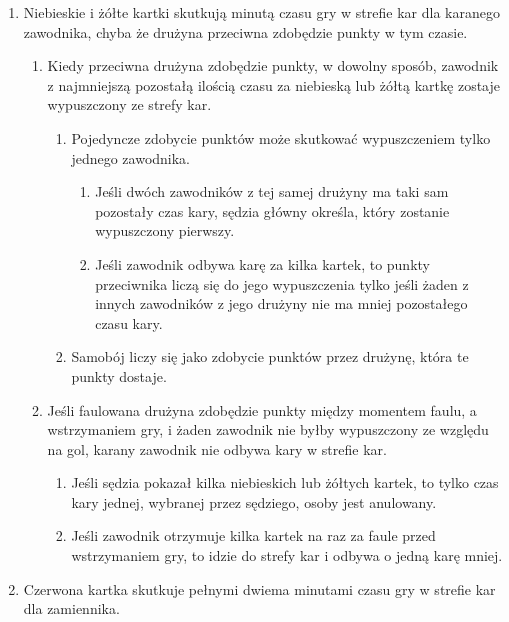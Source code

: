 \documentclass[11pt,a4paper]{article}
\renewcommand{\subsubsection}[1]{
  \oldsubsubsection{#1}%
  \label{\thesubsubsection}
}
\begin{document}
\subsubsection{Czas kary}
\begin{enumerate}
  \item Niebieskie i żółte kartki skutkują minutą czasu gry w strefie kar dla karanego zawodnika, chyba że drużyna przeciwna zdobędzie punkty w tym czasie.
  \begin{enumerate}
    \item Kiedy przeciwna drużyna zdobędzie punkty, w dowolny sposób, zawodnik z najmniejszą pozostałą ilością czasu za niebieską lub żółtą kartkę zostaje wypuszczony ze strefy kar.
    \begin{enumerate}
      \item Pojedyncze zdobycie punktów może skutkować wypuszczeniem tylko jednego zawodnika.
      \begin{enumerate}
        \item Jeśli dwóch zawodników z tej samej drużyny ma taki sam pozostały czas kary, sędzia główny określa, który zostanie wypuszczony pierwszy.
        \item Jeśli zawodnik odbywa karę za kilka kartek, to punkty przeciwnika liczą się do jego wypuszczenia tylko jeśli żaden z innych zawodników z jego drużyny nie ma mniej pozostałego czasu kary.
      \end{enumerate}
      \item Samobój liczy się jako zdobycie punktów przez drużynę, która te punkty dostaje.
    \end{enumerate}
    \item Jeśli faulowana drużyna zdobędzie punkty między momentem faulu, a wstrzymaniem gry, i żaden zawodnik nie byłby wypuszczony ze względu na gol, karany zawodnik nie odbywa kary w strefie kar.
    \begin{enumerate}
      \item Jeśli sędzia pokazał kilka niebieskich lub żółtych kartek, to tylko czas kary jednej, wybranej przez sędziego, osoby jest anulowany.
      \item Jeśli zawodnik otrzymuje kilka kartek na raz za faule przed wstrzymaniem gry, to idzie do strefy kar i odbywa o jedną karę mniej.
    \end{enumerate}
  \end{enumerate}
  \item Czerwona kartka skutkuje pełnymi dwiema minutami czasu gry w strefie kar dla zamiennika.
  \begin{enumerate}

\end{enumerate}
\end{enumerate}
\end{document}
